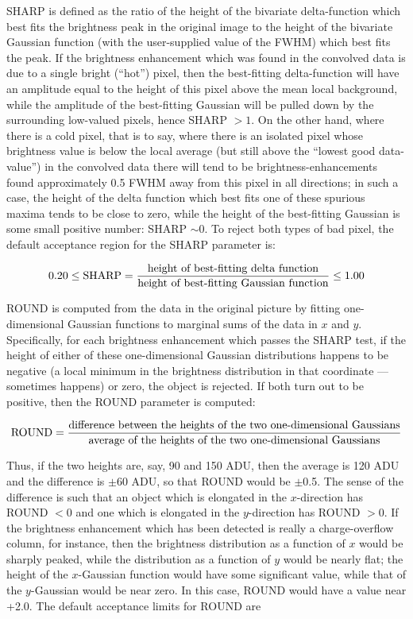 SHARP is defined as the ratio of the height of the bivariate
delta-function which best fits the brightness peak in the original
image to the height of the bivariate Gaussian function (with the
user-supplied value of the FWHM) which best fits the peak.  If the
brightness enhancement which was found in the convolved data is due to
a single bright (``hot'') pixel, then the best-fitting delta-function
will have an amplitude equal to the height of this pixel above the mean
local background, while the amplitude of the best-fitting Gaussian will
be pulled down by the surrounding low-valued pixels, hence SHARP $>
1$.  On the other hand, where there is a cold pixel, that is to say,
where there is an isolated pixel whose brightness value is below the
local average (but still above the ``lowest good data-value'') in the
convolved data there will tend to be brightness-enhancements found
approximately 0.5 FWHM away from this pixel in all directions; in such
a case, the height of the delta function which best fits one of these
spurious maxima tends to be close to zero, while the height of the
best-fitting Gaussian is some small positive number: SHARP $\sim 0$.
To reject both types of bad pixel, the default acceptance region for
the SHARP parameter is:

$$
0.20 \leq \hbox{\rm SHARP} = {\hbox{\rm height of best-fitting delta function}
\over \hbox{\rm height of best-fitting Gaussian function}} \leq 1.00
$$

ROUND is computed from the data in the original picture by fitting
one-dimensional Gaussian functions to marginal sums of the data in $x$
and $y$. Specifically, for each brightness enhancement which passes the
SHARP test, if the height of either of these one-dimensional Gaussian
distributions happens to be negative (a local minimum in the brightness
distribution in that coordinate --- sometimes happens) or zero, the
object is rejected.  If both turn out to be positive, then the ROUND
parameter is computed:

$$
\hbox{\rm ROUND} =
{\hbox{\rm difference between the heights of the two one-dimensional Gaussians}
\over
\hbox{\rm average of the heights of the two one-dimensional Gaussians}}
$$

\noindent Thus, if the two heights are, say, 90 and 150 ADU, then the
average is 120 ADU and the difference is $\pm$60 ADU, so that ROUND would
be $\pm$0.5.  The sense of the difference is such that an object which is
elongated in the $x$-direction has ROUND $<0$ and one which is
elongated in the $y$-direction has ROUND $>0$.  If the brightness
enhancement which has been detected is really a charge-overflow column,
for instance, then the brightness distribution as a function of $x$
would be sharply peaked, while the distribution as a function of $y$
would be nearly flat; the height of the $x$-Gaussian function would
have some significant value, while that of the $y$-Gaussian would be
near zero.  In this case, ROUND would have a value near +2.0.  The
default acceptance limits for ROUND are

